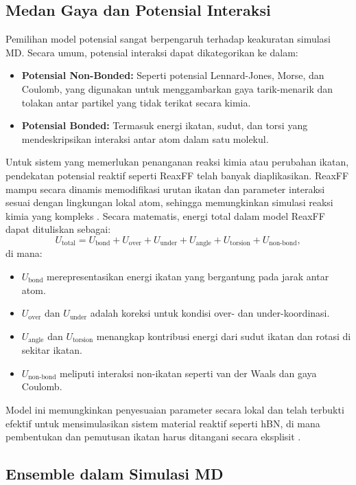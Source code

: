 \subsection{Medan Gaya dan Potensial Interaksi}
Pemilihan model potensial sangat berpengaruh terhadap keakuratan simulasi MD.
Secara umum, potensial interaksi dapat dikategorikan ke dalam:
\begin{itemize}
    \item \textbf{Potensial Non-Bonded:} Seperti potensial Lennard-Jones, Morse, dan Coulomb, yang digunakan untuk menggambarkan gaya tarik-menarik dan tolakan antar partikel yang tidak terikat secara kimia.
    \item \textbf{Potensial Bonded:} Termasuk energi ikatan, sudut, dan torsi yang mendeskripsikan interaksi antar atom dalam satu molekul.
\end{itemize}
Untuk sistem yang memerlukan penanganan reaksi kimia atau perubahan ikatan, pendekatan potensial reaktif seperti ReaxFF telah banyak diaplikasikan.
ReaxFF mampu secara dinamis memodifikasi urutan ikatan dan parameter interaksi sesuai dengan lingkungan lokal atom, sehingga memungkinkan simulasi reaksi kimia yang kompleks \citep{Lele2022}.
Secara matematis, energi total dalam model ReaxFF dapat dituliskan sebagai:
\begin{equation}
    U_{\text{total}} = U_{\text{bond}} + U_{\text{over}} + U_{\text{under}} + U_{\text{angle}} + U_{\text{torsion}} + U_{\text{non-bond}},
\end{equation}
di mana:
\begin{itemize}
    \item \( U_{\text{bond}} \) merepresentasikan energi ikatan yang bergantung pada jarak antar atom.
    \item \( U_{\text{over}} \) dan \( U_{\text{under}} \) adalah koreksi untuk kondisi over- dan under-koordinasi.
    \item \( U_{\text{angle}} \) dan \( U_{\text{torsion}} \) menangkap kontribusi energi dari sudut ikatan dan rotasi di sekitar ikatan.
    \item \( U_{\text{non-bond}} \) meliputi interaksi non-ikatan seperti van der Waals dan gaya Coulomb.
\end{itemize}
Model ini memungkinkan penyesuaian parameter secara lokal dan telah terbukti efektif untuk mensimulasikan sistem material reaktif seperti hBN, di mana pembentukan dan pemutusan ikatan harus ditangani secara eksplisit \citep{Lele2022}.

\subsection{Ensemble dalam Simulasi MD}

